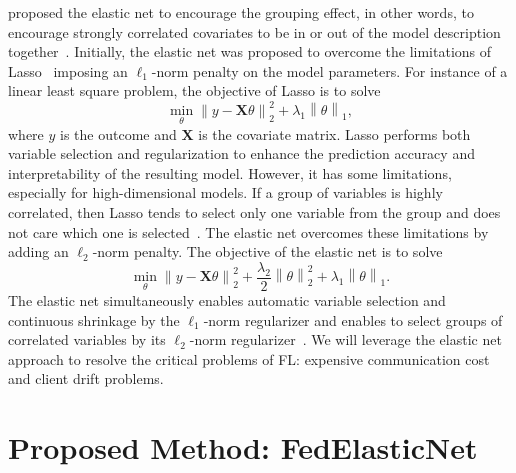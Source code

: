 \documentclass{article} %
\begin{document}
\citet{Zou2005regularization} proposed the elastic net to encourage the grouping effect, in other words, to encourage strongly correlated covariates to be in or out of the model description together~\citep{Hu2018group}. Initially, the elastic net was proposed to overcome the limitations of Lasso~\citep{Tibshirani1996regression} imposing an $\ell_1$-norm penalty on the model parameters. For instance of a linear least square problem, the objective of Lasso is to solve
\begin{equation}
    \underset{\theta }{\min} \left\|y - \mathbf{X}\theta  \right\|_2^2 + \lambda_1 \left\| \theta \right\|_{1},
\end{equation}
where $y$ is the outcome and $\mathbf{X}$ is the covariate matrix. Lasso performs both variable selection and regularization to enhance the prediction accuracy and interpretability of the resulting model. However, it has some limitations, especially for high-dimensional models. If a group of variables is highly correlated, then Lasso tends to select only one variable from the group and does not care which one is selected~\citep{Zou2005regularization}. The elastic net overcomes these limitations by adding an $\ell_2$-norm penalty. The objective of the elastic net is to solve
\begin{equation}
     \underset{\theta}\min\left\|y - \textbf{X}\theta  \right\|_2^2 + \frac{\lambda_2}{2} \left\|\theta  \right\|^2_2 + \lambda_1\left\| \theta \right\|_1.
\end{equation}
The elastic net simultaneously enables automatic variable selection and continuous shrinkage by the $\ell_1$-norm regularizer and enables to select groups of correlated variables by its $\ell_2$-norm regularizer~\citep{Zou2005regularization}. We will leverage the elastic net approach to resolve the critical problems of FL: expensive communication cost and client drift problems. 

\section{Proposed Method: FedElasticNet}
\end{document}
